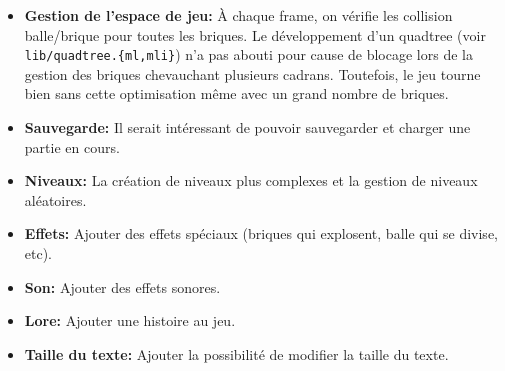 \documentclass[french]{template}
\begin{document}
\begin{itemize}
    \item \textbf{Gestion de l'espace de jeu:} À chaque frame, on vérifie les collision balle/brique pour toutes les briques. Le développement d'un quadtree (voir \texttt{lib/quadtree.\{ml,mli\}}) n'a pas abouti pour cause de blocage lors de la gestion des briques chevauchant plusieurs cadrans. Toutefois, le jeu tourne bien sans cette optimisation même avec un grand nombre de briques.
    \item \textbf{Sauvegarde:} Il serait intéressant de pouvoir sauvegarder et charger une partie en cours.
    \item \textbf{Niveaux:} La création de niveaux plus complexes et la gestion de niveaux aléatoires.
    \item \textbf{Effets:} Ajouter des effets spéciaux (briques qui explosent, balle qui se divise, etc).
    \item \textbf{Son:} Ajouter des effets sonores.
    \item \textbf{Lore:} Ajouter une histoire au jeu.
    \item \textbf{Taille du texte:} Ajouter la possibilité de modifier la taille du texte.
\end{itemize}
\end{document}
